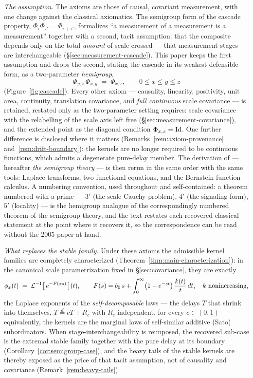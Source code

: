 \emph{The assumption.} The axioms are those of causal, covariant measurement, with one
change against the classical axiomatics. The semigroup form of the cascade property,
$\Phi_\tau \Phi_{\tau'} = \Phi_{\tau+\tau'}$, formalizes ``a measurement of a measurement
is a measurement'' together with a second, tacit assumption: that the composite depends
only on the total \emph{amount} of scale crossed --- that measurement stages are
interchangeable (\S\ref{sec:measurement-cascade}). This paper keeps the first assumption
and drops the second, stating the cascade in its weakest defensible form, as a
two-parameter \emph{hemigroup},
\[
  \Phi_{y,z}\,\Phi_{x,y} \;=\; \Phi_{x,z}, \qquad 0 \le x \le y \le z
\]
(Figure~\ref{fig:cascade}). Every other axiom --- causality, linearity, positivity, unit
area, continuity, translation covariance, and \emph{full continuous} scale covariance ---
is retained, restated only as the two-parameter setting requires: scale covariance with
the relabelling of the scale axis left free (\S\ref{sec:measurement-covariance}), and the
extended point as the diagonal condition $\Phi_{x,x} = \mathrm{Id}$. One further difference is
disclosed where it matters (Remarks~\ref{rem:axiom-provenance}
and~\ref{rem:drift-boundary}): the kernels are no longer required to be continuous
functions, which admits a degenerate pure-delay member. The derivation of
 --- hereafter \emph{the semigroup
theory} --- is then rerun in the same order with the same tools: Laplace transforms, two
functional equations, and the Bernstein-function calculus. A numbering convention, used
throughout and self-contained: a theorem numbered with a prime --- $3'$ (the scale-Cauchy
problem), $4'$ (the signaling form), $5'$ (locality) --- is the hemigroup analogue of the
correspondingly numbered theorem of the semigroup theory, and the text restates each
recovered classical statement at the point where it recovers it, so the correspondence
can be read without the 2005 paper at hand.

\emph{What replaces the stable family.} Under these axioms the admissible kernel families
are completely characterized (Theorem~\ref{thm:main-characterization}): in the canonical
scale parametrization fixed in \S\ref{sec:covariance}, they are exactly
\[
  \phi_x(t) \;=\; \mathcal{L}^{-1}\bigl[\,e^{-F(xs)}\,\bigr](t), \qquad
  F(s) = b_0\,s + \int_0^\infty\bigl(1 - e^{-st}\bigr)\,\frac{k(t)}{t}\,dt,
  \quad k \ \text{nonincreasing},
\]
the Laplace exponents of the \emph{self-decomposable} laws --- the delays $T$ that shrink
into themselves, $T \stackrel{d}{=} cT + R_c$ with $R_c$ independent, for every
$c \in (0,1)$ --- equivalently, the kernels are the marginal laws of self-similar additive
(Sato) subordinators. When stage-interchangeability is reimposed, the recovered sub-case
is the extremal stable family together with the pure delay at its boundary
(Corollary~\ref{cor:semigroup-case}), and the heavy tails of the stable kernels are
thereby exposed as the price of that tacit assumption, not of causality and covariance
(Remark~\ref{rem:heavy-tails}).

